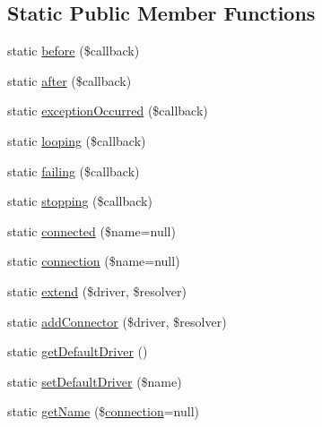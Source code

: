 \subsection*{Static Public Member Functions}
\begin{DoxyCompactItemize}
\item 
static \mbox{\hyperlink{class_illuminate_1_1_support_1_1_facades_1_1_queue_a98b4d092f13b6ad01c075f2790c15b40}{before}} (\$callback)
\item 
static \mbox{\hyperlink{class_illuminate_1_1_support_1_1_facades_1_1_queue_ab9c41644bd797b45622ab16eb93154f6}{after}} (\$callback)
\item 
static \mbox{\hyperlink{class_illuminate_1_1_support_1_1_facades_1_1_queue_aa9660b4de41a9ebb4f7dd26c8071a6da}{exception\+Occurred}} (\$callback)
\item 
static \mbox{\hyperlink{class_illuminate_1_1_support_1_1_facades_1_1_queue_a30bd51b47c8eea09ab5b11261c45efef}{looping}} (\$callback)
\item 
static \mbox{\hyperlink{class_illuminate_1_1_support_1_1_facades_1_1_queue_ad643d2fc351875a68b8327d3717eb514}{failing}} (\$callback)
\item 
static \mbox{\hyperlink{class_illuminate_1_1_support_1_1_facades_1_1_queue_af1dce728ca2ce292a6034d11bbd067a9}{stopping}} (\$callback)
\item 
static \mbox{\hyperlink{class_illuminate_1_1_support_1_1_facades_1_1_queue_a8f3205c731d192e78c749b4a586f9c48}{connected}} (\$name=null)
\item 
static \mbox{\hyperlink{class_illuminate_1_1_support_1_1_facades_1_1_queue_ac72dcbbe7e5f6b8366c31c30881af7fe}{connection}} (\$name=null)
\item 
static \mbox{\hyperlink{class_illuminate_1_1_support_1_1_facades_1_1_queue_ad95bc43c71e4d5191be6bfa129fe4170}{extend}} (\$driver, \$resolver)
\item 
static \mbox{\hyperlink{class_illuminate_1_1_support_1_1_facades_1_1_queue_a042f522a7874b4464d8756bf4d351501}{add\+Connector}} (\$driver, \$resolver)
\item 
static \mbox{\hyperlink{class_illuminate_1_1_support_1_1_facades_1_1_queue_a8146531a36a958787fac1ea14f54bdd3}{get\+Default\+Driver}} ()
\item 
static \mbox{\hyperlink{class_illuminate_1_1_support_1_1_facades_1_1_queue_a09145f9150bdb92fd6dbcc95511089b5}{set\+Default\+Driver}} (\$name)
\item 
static \mbox{\hyperlink{class_illuminate_1_1_support_1_1_facades_1_1_queue_a86e8629ef502a46f0a4c9255e740b550}{get\+Name}} (\$\mbox{\hyperlink{class_illuminate_1_1_support_1_1_facades_1_1_queue_ac72dcbbe7e5f6b8366c31c30881af7fe}{connection}}=null)

\end{DoxyCompactItemize}
